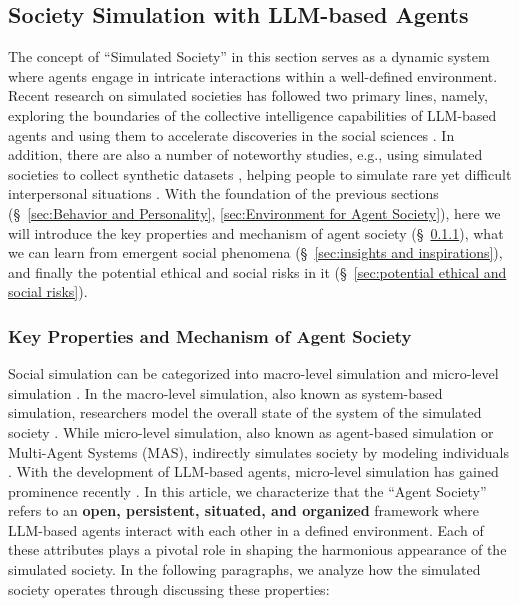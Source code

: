 \subsection{Society Simulation with LLM-based Agents}\label{sec:Society Simulation}
The concept of ``Simulated Society'' in this section serves as a dynamic system where agents engage in intricate interactions within a well-defined environment. 
Recent research on simulated societies has followed two primary lines, namely, exploring the boundaries of the collective intelligence capabilities of LLM-based agents \cite{DBLP:journals/corr/abs-2307-07924, DBLP:journals/corr/abs-2308-00352, DBLP:journals/corr/abs-2307-02485, DBLP:journals/corr/abs-2308-08155, DBLP:journals/corr/abs-2308-10848} and using them to accelerate discoveries in the social sciences \cite{DBLP:journals/corr/abs-2304-03442, DBLP:journals/corr/abs-2307-14984, doi:10.1126/science.adi1778}.
In addition, there are also a number of noteworthy studies, e.g., using simulated societies to collect synthetic datasets \cite{DBLP:journals/corr/abs-2303-17760, DBLP:journals/corr/abs-2306-02552,DBLP:journals/corr/abs-2304-13835}, helping people to simulate rare yet difficult interpersonal situations \cite{DBLP:journals/aim/HollanHW84, DBLP:journals/aim/TambeJJKLRS95}.
With the foundation of the previous sections (\S \ \ref{sec:Behavior and Personality}, \ref{sec:Environment for Agent Society}), here we will introduce the key properties and mechanism of agent society (\S \ \ref{sec:key properties and mechanism}), what we can learn from emergent social phenomena (\S \ \ref{sec:insights and inspirations}), and finally the potential ethical and social risks in it (\S \ \ref{sec:potential ethical and social risks}).

\subsubsection{Key Properties and Mechanism of Agent Society}\label{sec:key properties and mechanism}
Social simulation can be categorized into macro-level simulation and micro-level simulation \cite{DBLP:journals/corr/abs-2307-14984}. 
In the macro-level simulation, also known as system-based simulation, researchers model the overall state of the system of the simulated society \cite{VERMEULEN1976133, forrester1993system}.
While micro-level simulation, also known as agent-based simulation or Multi-Agent Systems (MAS), indirectly simulates society by modeling individuals \cite{sante2010cellular, dorri2018multi}.
With the development of LLM-based agents, micro-level simulation has gained prominence recently \cite{DBLP:journals/corr/abs-2304-03442, DBLP:journals/corr/abs-2308-04026}.
In this article, we characterize that the ``Agent Society'' refers to an \textbf{open, persistent, situated, and organized} framework \cite{DBLP:books/sp/Costa19} where LLM-based agents interact with each other in a defined environment. 
Each of these attributes plays a pivotal role in shaping the harmonious appearance of the simulated society.
In the following paragraphs, we analyze how the simulated society operates through discussing these properties:

